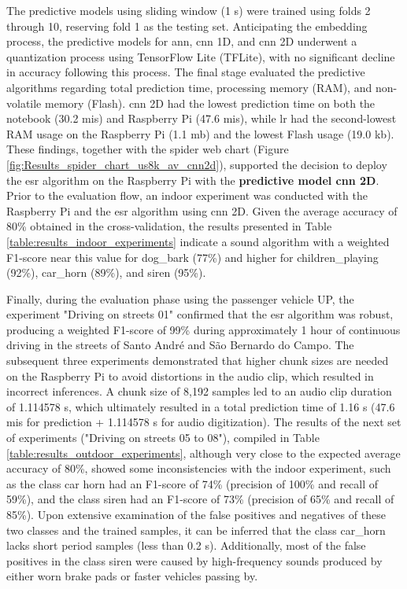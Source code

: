The predictive models using sliding window (1 \gls{s}) were trained using folds 2 through 10, reserving fold 1 as the testing set. Anticipating the embedding process, the predictive models for \gls{ann}, \gls{cnn} 1D, and \gls{cnn} 2D underwent a quantization process using TensorFlow Lite (TFLite), with no significant decline in accuracy following this process. The final stage evaluated the predictive algorithms regarding total prediction time, processing memory (RAM), and non-volatile memory (Flash). \gls{cnn} 2D had the lowest prediction time on both the notebook (30.2 \gls{mi}\gls{s}) and Raspberry Pi (47.6 \gls{mi}\gls{s}), while \gls{lr} had the second-lowest RAM usage on the Raspberry Pi (1.1 \gls{m}\gls{b}) and the lowest Flash usage (19.0 \gls{k}\gls{b}). These findings, together with the spider web chart (Figure \ref{fig:Results_spider_chart_us8k_av_cnn2d}), supported the decision to deploy the \gls{esr} algorithm on the Raspberry Pi with the \textbf{predictive model \gls{cnn} 2D}. Prior to the evaluation flow, an indoor experiment was conducted with the Raspberry Pi and the \gls{esr} algorithm using \gls{cnn} 2D. Given the average accuracy of 80\% obtained in the cross-validation, the results presented in Table \ref{table:results_indoor_experiments} indicate a sound algorithm with a weighted F1-score near this value for dog\_bark (77\%) and higher for children\_playing (92\%), car\_horn (89\%), and siren (95\%).



Finally, during the evaluation phase using the passenger vehicle UP, the experiment "Driving on streets 01" confirmed that the \gls{esr} algorithm was robust, producing a weighted F1-score of 99\% during approximately 1 hour of continuous driving in the streets of Santo André and São Bernardo do Campo. The subsequent three experiments demonstrated that higher chunk sizes are needed on the Raspberry Pi to avoid distortions in the audio clip, which resulted in incorrect inferences. A chunk size of 8,192 samples led to an audio clip duration of 1.114578 \gls{s}, which ultimately resulted in a total prediction time of 1.16 \gls{s} (47.6 \gls{mi}\gls{s} for prediction + 1.114578 \gls{s} for audio digitization). The results of the next set of experiments ("Driving on streets 05 to 08"), compiled in Table \ref{table:results_outdoor_experiments}, although very close to the expected average accuracy of 80\%, showed some inconsistencies with the indoor experiment, such as the class car horn had an F1-score of 74\% (precision of 100\% and recall of 59\%), and the class siren had an F1-score of 73\% (precision of 65\% and recall of 85\%). Upon extensive examination of the false positives and negatives of these two classes and the trained samples, it can be inferred that the class car\_horn lacks short period samples (less than 0.2 \gls{s}). Additionally, most of the false positives in the class siren were caused by high-frequency sounds produced by either worn brake pads or faster vehicles passing by.

